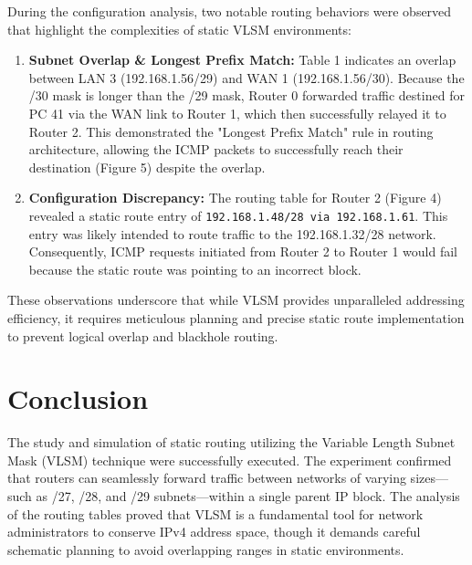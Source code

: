 \documentclass[11pt]{article}
\begin{document}
During the configuration analysis, two notable routing behaviors were observed that highlight the complexities of static VLSM environments:
\begin{enumerate}
    \item \textbf{Subnet Overlap \& Longest Prefix Match:} Table 1 indicates an overlap between LAN 3 (192.168.1.56/29) and WAN 1 (192.168.1.56/30). Because the /30 mask is longer than the /29 mask, Router 0 forwarded traffic destined for PC 41 via the WAN link to Router 1, which then successfully relayed it to Router 2. This demonstrated the "Longest Prefix Match" rule in routing architecture, allowing the ICMP packets to successfully reach their destination (Figure 5) despite the overlap.
    \item \textbf{Configuration Discrepancy:} The routing table for Router 2 (Figure 4) revealed a static route entry of \texttt{192.168.1.48/28 via 192.168.1.61}. This entry was likely intended to route traffic to the 192.168.1.32/28 network. Consequently, ICMP requests initiated from Router 2 to Router 1 would fail because the static route was pointing to an incorrect block.
\end{enumerate}

These observations underscore that while VLSM provides unparalleled addressing efficiency, it requires meticulous planning and precise static route implementation to prevent logical overlap and blackhole routing.

\section{Conclusion}
The study and simulation of static routing utilizing the Variable Length Subnet Mask (VLSM) technique were successfully executed. The experiment confirmed that routers can seamlessly forward traffic between networks of varying sizes—such as /27, /28, and /29 subnets—within a single parent IP block. The analysis of the routing tables proved that VLSM is a fundamental tool for network administrators to conserve IPv4 address space, though it demands careful schematic planning to avoid overlapping ranges in static environments.


\renewcommand{\bibname}{References}

\end{document}
